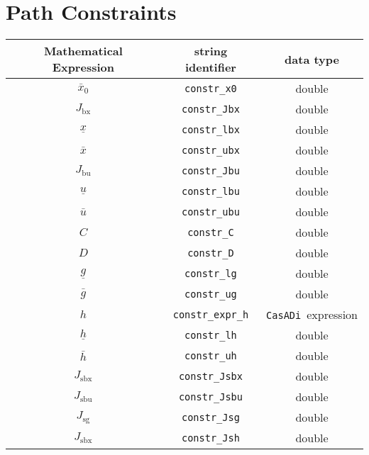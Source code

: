 \documentclass{article}
\newcommand{\code}[1]{\texttt{#1}}
\newcommand{\casadi}{\texttt{CasADi}}
\newcommand{\ind}[1]{_{\textrm{#1}}}
\begin{document}
\section{Path Constraints}
\begin{table}[h]
	\centering
	\begin{tabular}{|c|c|c|}
		\toprule
		Mathematical Expression                    & string identifier & data type \\ \midrule
		$ \bar{x}_0 $ & \code{constr\_x0} & double \\ \midrule
		$J_{\textrm{bx}}$ & \code{constr\_Jbx}    & double    \\
		$\underline{x} $    & \code{constr\_lbx}     & double    \\
		$\bar{x} $         & \code{constr\_ubx}     & double   \\ \midrule
		$J_{\textrm{bu}}$ & \code{constr\_Jbu}    & double    \\
		$\underline{u} $    & \code{constr\_lbu}     & double    \\
		$\bar{u} $         & \code{constr\_ubu}     & double   \\ \midrule
		$C$ & \code{constr\_C}    & double    \\
		$D $    & \code{constr\_D}     & double    \\
		$\underline{g} $    & \code{constr\_lg}     & double    \\
		$\bar{g} $         & \code{constr\_ug}     & double   \\ \midrule
		$ h $ & \code{constr\_expr\_h}    & \casadi~expression   \\
		$\underline{h} $    & \code{constr\_lh}     & double    \\
		$\bar{h} $         & \code{constr\_uh}     & double   \\ \midrule
		$ J\ind{sbx} $ & \code{constr\_Jsbx} & double \\
		$ J\ind{sbu} $ & \code{constr\_Jsbu} & double \\
		$ J\ind{sg} $ & \code{constr\_Jsg} & double \\
		$ J\ind{sbx} $ & \code{constr\_Jsh} & double \\
		\bottomrule
	\end{tabular}
\end{table}

\end{document}
